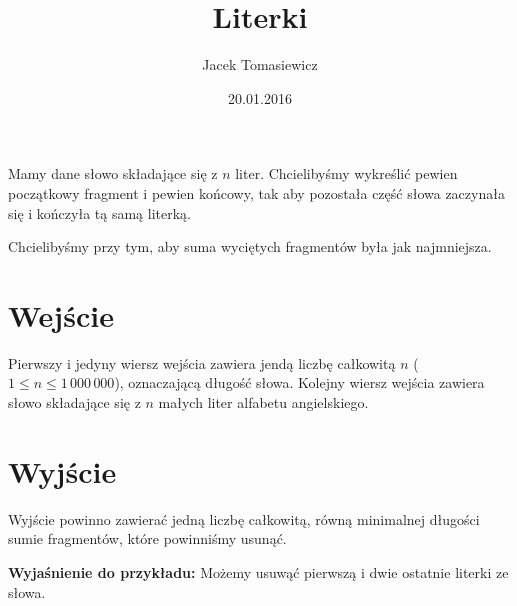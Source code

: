 \documentclass[zad,zawodnik,utf8]{sinol}
\title{Literki}
\author{Jacek Tomasiewicz} %
\date{20.01.2016}
\begin{document}
  \begin{tasktext}%
Mamy dane słowo składające się z $n$ liter. Chcielibyśmy wykreślić pewien początkowy fragment i pewien  końcowy, tak aby pozostała część słowa zaczynała się i kończyła tą samą literką.

Chcielibyśmy przy tym, aby suma wyciętych fragmentów była jak najmniejsza. 

  \section{Wejście}
Pierwszy i jedyny wiersz wejścia zawiera jendą liczbę całkowitą $n$ ($1 \leq n \leq 1\,000\,000$),  oznaczającą długość słowa. Kolejny wiersz wejścia zawiera słowo składające się z $n$ małych liter  alfabetu angielskiego.

  \section{Wyjście}
Wyjście powinno zawierać jedną liczbę całkowitą, równą minimalnej długości sumie fragmentów, które  powinniśmy usunąć.

     \makecompactexample

\medskip
  \noindent
  \textbf{Wyjaśnienie do przykładu:} 
Możemy usuwąć pierwszą i dwie ostatnie literki ze słowa.

  \end{tasktext}
\end{document}

